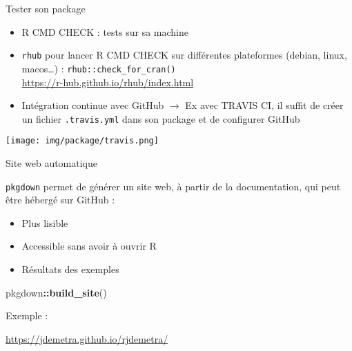 \documentclass[10pt,xcolor=table,color={dvipsnames,usenames},ignorenonframetext,usepdftitle=false,french]{beamer}
\newenvironment{Shaded}{\begin{snugshade}}{\end{snugshade}}
\newcommand{\KeywordTok}[1]{\textcolor[rgb]{0.13,0.29,0.53}{\textbf{#1}}}
\newcommand{\NormalTok}[1]{#1}
\newcommand{\OperatorTok}[1]{\textcolor[rgb]{0.81,0.36,0.00}{\textbf{#1}}}
\providecommand{\tightlist}{%
  \setlength{\parskip}{0pt}
  }
\begin{document}
\begin{frame}[fragile]{Tester son package}
\protect\hypertarget{tester-son-package}{}

\begin{itemize}
\tightlist
\item
  R CMD CHECK : tests sur sa machine
\end{itemize}

\pause

\begin{itemize}
\tightlist
\item
  \texttt{rhub} pour lancer R CMD CHECK sur différentes plateformes
  (debian, linux, macos\ldots{}) : \texttt{rhub::check\_for\_cran()}\\
  \faGithub{} \url{https://r-hub.github.io/rhub/index.html}
\end{itemize}

\pause

\begin{itemize}
\tightlist
\item
  Intégration continue avec GitHub \(\rightarrow\) Ex avec TRAVIS CI, il
  suffit de créer un fichier \texttt{.travis.yml} dans son package et de
  configurer GitHub
\end{itemize}

\texttt{[image: img/package/travis.png]}

\end{frame}

\begin{frame}[fragile]{Site web automatique}
\protect\hypertarget{site-web-automatique}{}

\texttt{pkgdown} permet de générer un site web, à partir de la
documentation, qui peut être hébergé sur GitHub :

\begin{itemize}
\item
  Plus lisible
\item
  Accessible sans avoir à ouvrir R
\item
  Résultats des exemples
\end{itemize}

\begin{Shaded}
\begin{Highlighting}[]
\NormalTok{pkgdown}\OperatorTok{::}\KeywordTok{build_site}\NormalTok{()}
\end{Highlighting}
\end{Shaded}

Exemple :

\url{https://jdemetra.github.io/rjdemetra/}

\end{frame}
\end{document}
